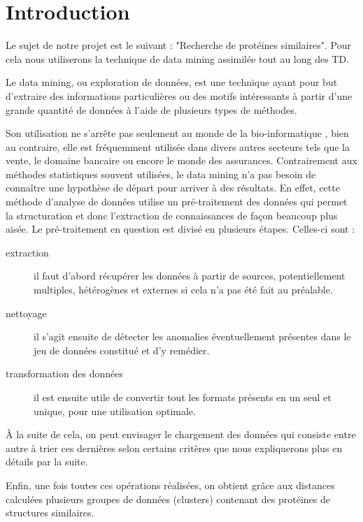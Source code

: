 \section*{Introduction}
Le sujet de notre projet est le suivant : "Recherche de protéines similaires". Pour cela nous utiliserons la technique de data mining assimilée tout au long des TD.

Le data mining, ou exploration de données, est une technique ayant pour but d'extraire des informations particulières ou des motifs intéressants à partir d'une grande quantité de données à l'aide de plusieurs types de méthodes.

Son utilisation ne s'arrête pas seulement au monde de la bio-informatique , bien au contraire, elle est fréquemment utilisée dans divers autres secteurs tels que la vente, le domaine bancaire ou encore le monde des assurances.
Contrairement aux méthodes statistiques souvent utilisées, le data mining n'a pas besoin de connaître une hypothèse de départ pour arriver à des résultats. En effet, cette méthode  d'analyse de données utilise un pré-traitement des données qui permet la structuration et donc l'extraction de connaissances de façon beaucoup plus aisée. Le pré-traitement en question est divisé en plusieurs étapes. Celles-ci sont :
\begin{description}
\item[extraction]il faut d'abord récupérer les données à partir de sources, potentiellement multiples, hétérogènes et externes si cela n'a pas été fait au préalable.
\item[nettoyage]il s'agit ensuite de détecter les anomalies éventuellement présentes dans le jeu de données constitué et d'y remédier.
\item[transformation des données] il est ensuite utile de convertir tout les formats présents en un seul et unique, pour une utilisation optimale.
\end{description}

À la suite de cela, on peut envisager le chargement des données qui consiste entre autre à trier ces dernières selon certains critères que nous expliquerons plus en détails par la suite.

Enfin, une fois toutes ces opérations réalisées, on obtient gr\^ace aux distances calculées plusieurs groupes de données (clusters) contenant des protéines de structures similaires.